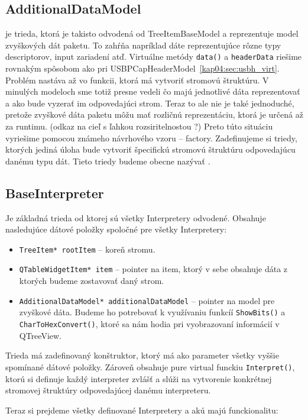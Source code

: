 \subsection{AdditionalDataModel}
je trieda, ktorá je takisto odvodená od TreeItemBaseModel a reprezentuje model zvyškových dát paketu. To zahŕňa napríklad dáte reprezentujúce rôzne typy descriptorov, input zariadení atď. Virtuálne metódy \texttt{data()} a \texttt{headerData} riešime rovnakým spôsobom ako pri USBPCapHeaderModel~\ref{kap04:sec:usbh_virt}. Problém nastáva až vo funkcii, ktorá má vytvoriť stromovú štruktúru. V minulých modeloch sme totiž presne vedeli čo majú jednotlivé dáta reprezentovať a ako bude vyzerať im odpovedajúci strom. Teraz to ale nie je také jednoduché, pretože zvyškové dáta paketu môžu mať rozličnú reprezentáciu, ktorá je určená až za runtimu. (odkaz na cieľ s ľahkou rozsiritelnostou ?) Preto túto situáciu vyriešime pomocou známeho návrhového vzoru -- factory. Zadefinujeme si triedy, ktorých jediná úloha bude vytvoriť špecifickú stromovú štruktúru odpovedajúcu danému typu dát. Tieto triedy budeme obecne nazývať .

\subsection{BaseInterpreter}
Je základná trieda od ktorej sú všetky Interpretery odvodené. Obsahuje nasledujúce dátové položky spoločné pre všetky Interpretery:
\begin{itemize}
\item \texttt{TreeItem* rootItem} -- koreň stromu.
\item \texttt{QTableWidgetItem* item} -- pointer na item, ktorý v sebe obsahuje dáta z ktorých budeme zostavovať daný strom.
\item \texttt{AdditionalDataModel* additionalDataModel} -- pointer na model pre zvyškové dáta. Budeme ho potrebovať k využívaniu funkcíí \texttt{ShowBits()} a \texttt{CharToHexConvert()}, ktoré sa nám hodia pri vyobrazovaní informácií v QTreeView.
\end{itemize}

Trieda má zadefinovaný konštruktor, ktorý má ako parameter všetky vyššie spomínané dátové položky. Zároveň obsahuje pure virtual funckiu \texttt{Interpret()}, ktorú si definuje každý interpreter zvlášť a slúži na vytvorenie konkrétnej stromovej štruktúry odpovedajúcej danému interpreteru.

Teraz si prejdeme všetky definované Interpretery a akú majú funckionalitu:

